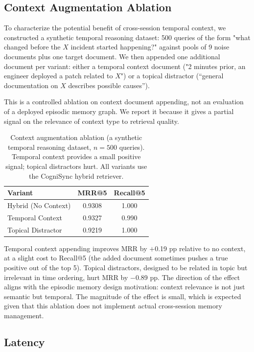 \documentclass[sigconf]{acmart}
\begin{document}
\subsection{Context Augmentation Ablation}
\label{sec}

To characterize the potential benefit of cross-session temporal context, we
constructed a synthetic temporal reasoning dataset: 500 queries of the form
"what changed before the $X$ incident started happening?" against pools of
9 noise documents plus one target document. We then appended one additional
document per variant: either a temporal context document ("2 minutes prior,
an engineer deployed a patch related to $X$") or a topical distractor (``general
documentation on $X$ describes possible causes'').

This is a controlled ablation on context document appending, not an evaluation
of a deployed episodic memory graph. We report it because it gives a partial
signal on the relevance of context type to retrieval quality.

\begin{table}[t]
\centering
\caption{Context augmentation ablation (a synthetic temporal reasoning dataset, $n=500$
queries). Temporal context provides a small positive signal; topical distractors
hurt. All variants use the CogniSync hybrid retriever.}
\label{tab}
\begin{tabular}{lcc}
\toprule
Variant & MRR@5 & Recall@5 \\
\midrule
Hybrid (No Context) & 0.9308 & 1.000 \\
Temporal Context & 0.9327 & 0.990 \\
Topical Distractor & 0.9219 & 1.000 \\
\bottomrule
\end{tabular}
\end{table}

Temporal context appending improves MRR by $+$0.19 pp relative to no context,
at a slight cost to Recall@5 (the added document sometimes pushes a true
positive out of the top 5). Topical distractors, designed to be related in
topic but irrelevant in time ordering, hurt MRR by $-$0.89 pp. The direction of
the effect aligns with the episodic memory design motivation: context relevance
is not just semantic but temporal. The magnitude of the effect is small, which
is expected given that this ablation does not implement actual cross-session
memory management.

\subsection{Latency}
\label{sec}
\end{document}
